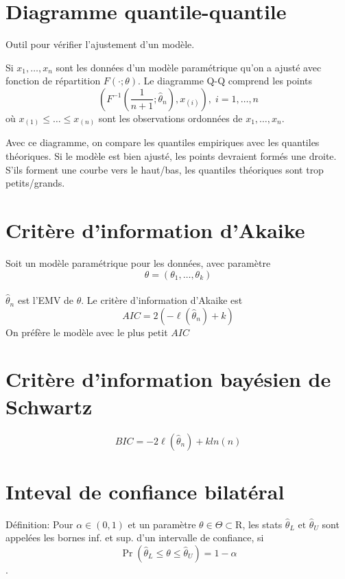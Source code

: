 \section{Diagramme quantile-quantile}\label{diagramme-quantile-quantile}

Outil pour vérifier l'ajustement d'un modèle.

Si \(x_1,\dots,x_n\) sont les données d'un modèle paramétrique qu'on a
ajusté avec fonction de répartition \(F(\cdot;\theta)\). Le diagramme
Q-Q comprend les points \[
\left (F^{-1}\left(\dfrac{1}{n+1};\hat{\theta}_n\right),x_{(i)}\right ),\;i=1,\dots,n
\] où \(x_{(1)} \leq \dots \leq x_{(n)}\) sont les observations
ordonnées de \(x_1,\dots,x_n\).

Avec ce diagramme, on compare les quantiles empiriques avec les
quantiles théoriques. Si le modèle est bien ajusté, les points devraient
formés une droite. S'ils forment une courbe vers le haut/bas, les
quantiles théoriques sont trop petits/grands.

\section{Critère d'information d'Akaike}\label{critere-dinformation-dakaike}

Soit un modèle paramétrique pour les données, avec paramètre \[
\theta=(\theta_1,\dots,\theta_k) 
\]\\
\(\hat{\theta}_n\) est l'EMV de \(\theta\). Le critère d'information
d'Akaike est \[
AIC = 2(-\ell(\hat{\theta}_n)+k)
\] On préfère le modèle avec le plus petit \(AIC\)

\section{Critère d'information bayésien de Schwartz}\label{critere-dinformation-bayesien-de-schwartz}

\[
BIC = -2\ell(\hat{\theta}_n)+k ln(n)
\]


\section{Inteval de confiance bilatéral}

Définition:
Pour $\alpha \in (0,1)$ et un paramètre $\theta \in \Theta \subset \mathrm{R}$, les stats $\hat{\theta}_L \text{ et } \hat{\theta}_U$ sont appelées les bornes inf. et sup. d'un intervalle de confiance, si 
\[\Pr(\hat{\theta}_L \leq \theta \leq \hat{\theta}_U
) = 1- \alpha\].

